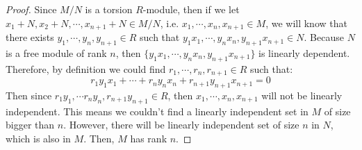 \begin{answer}
    \begin{proof}
        Since $M/N$ is a torsion $R$-module, then if we let $x_1+N,x_2+N,\cdots,x_{n+1}+N \in M/N$, i.e. $x_1,\cdots,x_n,x_{n+1}\in M$, we will know that there exists $y_1,\cdots,y_n,y_{n+1} \in R$ such that $y_1x_1,\cdots,y_nx_n,y_{n+1}x_{n+1} \in N$. Because $N$ is a free module of rank $n$, then $\{y_1x_1,\cdots,y_nx_n,y_{n+1}x_{n+1}\}$ is linearly dependent. Therefore, by definition we could find $r_1,\cdots,r_n,r_{n+1} \in R$ such that:
        \begin{equation}
            r_1y_1x_1 + \cdots + r_ny_nx_n + r_{n+1}y_{n+1}x_{n+1} = 0
        \end{equation}
        Then since $r_1y_1,\cdots r_ny_n,r_{n+1}y_{n+1} \in R$, then $x_1,\cdots,x_n,x_{n+1}$ will not be linearly independent. This means we couldn't find a linearly independent set in $M$ of size bigger than $n$. However, there will be linearly independent set of size $n$ in $N$, which is also in $M$. Then, $M$ has rank $n$.
    \end{proof}
\end{answer}
